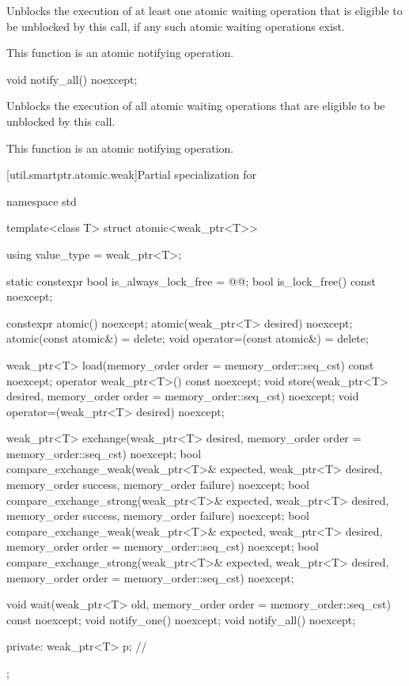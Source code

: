\begin{itemdescr}
\pnum
\effects
Unblocks the execution of at least one atomic waiting operation
that is eligible to be unblocked by this call,
if any such atomic waiting operations exist.

\pnum
\remarks
This function is an atomic notifying operation.
\end{itemdescr}

%
\begin{itemdecl}
void notify_all() noexcept;
\end{itemdecl}

\begin{itemdescr}
\pnum
\effects
Unblocks the execution of all atomic waiting operations
that are eligible to be unblocked by this call.

\pnum
\remarks
This function is an atomic notifying operation.
\end{itemdescr}

[util.smartptr.atomic.weak]{Partial specialization for }
%
\begin{codeblock}
namespace std {
  template<class T> struct atomic<weak_ptr<T>> {
    using value_type = weak_ptr<T>;

    static constexpr bool is_always_lock_free = @@;
    bool is_lock_free() const noexcept;

    constexpr atomic() noexcept;
    atomic(weak_ptr<T> desired) noexcept;
    atomic(const atomic&) = delete;
    void operator=(const atomic&) = delete;

    weak_ptr<T> load(memory_order order = memory_order::seq_cst) const noexcept;
    operator weak_ptr<T>() const noexcept;
    void store(weak_ptr<T> desired, memory_order order = memory_order::seq_cst) noexcept;
    void operator=(weak_ptr<T> desired) noexcept;

    weak_ptr<T> exchange(weak_ptr<T> desired,
                         memory_order order = memory_order::seq_cst) noexcept;
    bool compare_exchange_weak(weak_ptr<T>& expected, weak_ptr<T> desired,
                               memory_order success, memory_order failure) noexcept;
    bool compare_exchange_strong(weak_ptr<T>& expected, weak_ptr<T> desired,
                                 memory_order success, memory_order failure) noexcept;
    bool compare_exchange_weak(weak_ptr<T>& expected, weak_ptr<T> desired,
                               memory_order order = memory_order::seq_cst) noexcept;
    bool compare_exchange_strong(weak_ptr<T>& expected, weak_ptr<T> desired,
                                 memory_order order = memory_order::seq_cst) noexcept;

    void wait(weak_ptr<T> old, memory_order order = memory_order::seq_cst) const noexcept;
    void notify_one() noexcept;
    void notify_all() noexcept;

  private:
    weak_ptr<T> p;              // \expos
  };
}
\end{codeblock}

